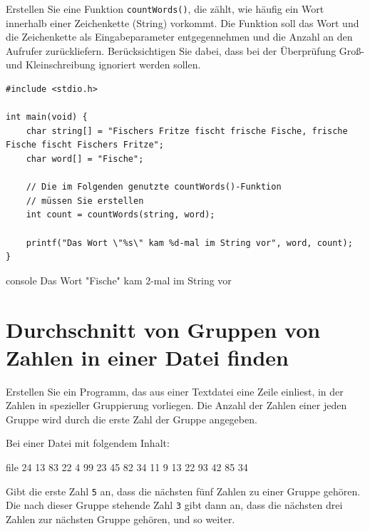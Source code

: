 \vspace{10pt}

Erstellen Sie eine Funktion \texttt{countWords()}, die zählt, wie häufig
ein Wort innerhalb einer Zeichenkette (String) vorkommt. Die Funktion soll das
Wort und die Zeichenkette als Eingabeparameter entgegennehmen und die Anzahl an
den Aufrufer zurückliefern. Berücksichtigen Sie dabei, dass bei der Überprüfung
Groß- und Kleinschreibung ignoriert werden sollen.

\Vorlage
\begin{verbatim}
#include <stdio.h>

int main(void) {
    char string[] = "Fischers Fritze fischt frische Fische, frische Fische fischt Fischers Fritze";
    char word[] = "Fische";

    // Die im Folgenden genutzte countWords()-Funktion
    // müssen Sie erstellen
    int count = countWords(string, word);

    printf("Das Wort \"%s\" kam %d-mal im String vor", word, count);
}
\end{verbatim}

\begin{mybox}[Bildschirmausgabe]{console}
Das Wort "Fische" kam 2-mal im String vor
\end{mybox}



\chapter{Durchschnitt von Gruppen von Zahlen in einer Datei finden}

\vspace{10pt}

Erstellen Sie ein Programm, das aus einer Textdatei eine Zeile einliest, in der
Zahlen in spezieller Gruppierung vorliegen. Die Anzahl der Zahlen einer jeden
Gruppe wird durch die erste Zahl der Gruppe angegeben.

Bei einer Datei mit folgendem Inhalt:

\begin{mybox}{file}
 24 13 83 22 4  99 23 45  82 34 11 9  13 22 93 42 85 34
\end{mybox}

Gibt die erste Zahl \texttt{5} an, dass die nächsten fünf Zahlen zu
einer Gruppe gehören. Die nach dieser Gruppe stehende Zahl \texttt{3}
gibt dann an, dass die nächsten drei Zahlen zur nächsten Gruppe gehören, und so
weiter.

